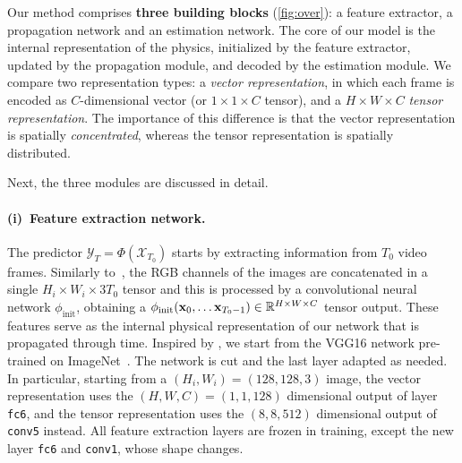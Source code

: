Our method comprises \textbf{three building blocks} (\cref{fig:over}): a feature extractor, a propagation network and an estimation network. The core of our model is the internal representation of the physics, initialized by the feature extractor, updated by the propagation module, and decoded by the estimation module. We compare two representation types: a \emph{vector representation}, in which each frame is encoded as $C$-dimensional vector (or $1 \times 1 \times C$ tensor), and a $H \times W \times C$ \emph{tensor representation}. The importance of this difference is that the vector representation is spatially \emph{concentrated}, whereas the tensor representation is spatially distributed.

Next, the three modules are discussed in detail.

\paragraph{(i)~Feature extraction network.}
The predictor $\mathcal{Y}_T = \Phi(\mathcal{X}_{T_0})$ starts by extracting information from $T_0$ video frames. Similarly to~\cite{fragkiadaki2015learning}, the RGB channels of the images are concatenated in a single $H_i \times W_i \times 3T_0$ tensor and this is processed by a convolutional neural network $\phi_\text{init}$, obtaining a $\phi_\text{init}(\mathbf{x}_0, \ldots \mathbf{x}_{T_0-1}) \in \mathbb{R}^{H\times W\times C}$ tensor output. These features serve as the internal physical representation of our network that is propagated through time. Inspired by \cite{fragkiadaki2015learning}, we start from the VGG16 network pre-trained on \mbox{ImageNet~\cite{Simonyan15}}. The network is cut and the last layer adapted as needed. In particular, starting from a $(H_i,W_i)=(128,128,3)$ image, the vector representation uses the $(H,W,C)=(1,1,128)$ dimensional output of layer \texttt{fc6}, and the tensor representation uses the $(8,8,512)$ dimensional output of \texttt{conv5} instead. All feature extraction layers are frozen in training, except the new layer \texttt{fc6} and \texttt{conv1}, whose shape changes.


